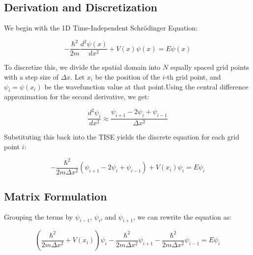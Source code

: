\documentclass[12pt, a4paper, twoside]{article}
\begin{document}
        \subsection{Derivation and Discretization}
        We begin with the 1D Time-Independent Schrödinger Equation:

        $$-\frac{\hbar^2}{2m} \frac{d^2\psi(x)}{dx^2} + V(x)\psi(x) = E\psi(x)$$

        To discretize this, we divide the spatial domain into $N$ equally spaced grid points with a step size of $\Delta x$. Let $x_i$ be the position of the $i$-th grid point, and $\psi_i = \psi(x_i)$ be the wavefunction value at that point.Using the central difference approximation for the second derivative, we get:
        
        $$\frac{d^2\psi_i}{dx^2} \approx \frac{\psi_{i+1} - 2\psi_i + \psi_{i-1}}{\Delta x^2}$$
        
        Substituting this back into the TISE yields the discrete equation for each grid point $i$:
        
        $$-\frac{\hbar^2}{2m \Delta x^2} (\psi_{i+1} - 2\psi_i + \psi_{i-1}) + V(x_i)\psi_i = E\psi_i$$

        \subsection{Matrix Formulation}
        Grouping the terms by $\psi_{i-1}$, $\psi_i$, and $\psi_{i+1}$, we can rewrite the equation as:
        
        $$\left( \frac{\hbar^2}{2m \Delta x^2} + V(x_i) \right) \psi_i - \frac{\hbar^2}{2m \Delta x^2} \psi_{i+1} - \frac{\hbar^2}{2m \Delta x^2} \psi_{i-1} = E\psi_i$$
        
\end{document}
